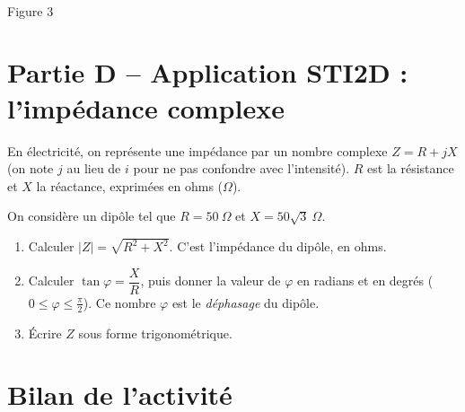 \documentclass[11pt,a4paper]{article}
\begin{document}
\begin{center}
\\[2pt]
{\footnotesize Figure 3}
\end{center}

\section*{Partie D -- Application STI2D : l'impédance complexe}

En électricité, on représente une impédance par un nombre complexe
$Z = R + jX$ (on note $j$ au lieu de $i$ pour ne pas confondre avec l'intensité).
$R$ est la résistance et $X$ la réactance, exprimées en ohms ($\Omega$).

On considère un dipôle tel que $R = 50\ \Omega$ et $X = 50\sqrt{3}\ \Omega$.

\begin{enumerate}[label=\textbf{\arabic*.}]
  \item Calculer $|Z| = \sqrt{R^2 + X^2}$. C'est l'impédance du dipôle, en ohms.
  \item Calculer $\tan\varphi = \dfrac{X}{R}$, puis donner la valeur de $\varphi$ en radians
        et en degrés ($0 \leqslant \varphi \leqslant \frac{\pi}{2}$).
        Ce nombre $\varphi$ est le \emph{déphasage} du dipôle.
  \item Écrire $Z$ sous forme trigonométrique.
\end{enumerate}

\section*{Bilan de l'activité}
\end{document}
